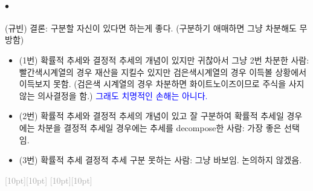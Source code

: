 \documentclass[12pt,oneside,english]{book}
\newcommand{\rdash}{\noindent \textcolor{darkgray}{ \raisebox{-1.9pt}[10pt][10pt]{\leafright} \hrulefill \raisebox{-1.9pt}[10pt][10pt]{\leafright \decofourleft \decothreeleft  \aldineright \decotwo \floweroneleft \decoone}}}
\def\ck{\paragraph{\Large$\bullet$}\Large}
\begin{document}
\ck (규빈) 결론: 구분할 자신이 있다면 하는게 좋다. (구분하기 애매하면 그냥 차분해도 무방함)
\begin{itemize}
	\item (1번) 확률적 추세와 결정적 추세의 개념이 있지만 귀찮아서 그냥 2번 차분한 사람: 빨간색시계열의 경우 재산을 지킬수 있지만 검은색시계열의 경우 이득볼 상황에서 이득보지 못함. (검은색 시계열의 경우 차분하면 화이트노이즈이므로 주식을 사지 않는 의사결정을 함.) \textcolor{blue}{그래도 치명적인 손해는 아니다.}
	\item (2번) 확률적 추세와 결정적 추세의 개념이 있고 잘 구분하여 확률적 추세일 경우에는 차분을 결정적 추세일 경우에는 추세를 decompose한 사람: 가장 좋은 선택임.  
	\item (3번) 확률적 추세 결정적 추세 구분 못하는 사람: 그냥 바보임. 논의하지 않겠음. 
\end{itemize}

\rdash 
\end{document}
